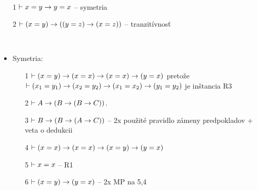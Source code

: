 \begin{lema}
~
    \begin{itemize}
        \item[1] $\vdash x=y \rightarrow y=x$ -- symetria
        \item[2] $\vdash (x=y) \rightarrow ((y=z) \rightarrow (x=z))$ --
            tranzitívnosť
    \end{itemize}
\end{lema}
\begin{dokaz}
~
\begin{itemize}
    \item Symetria:
        \begin{itemize}
        \item[1] $\vdash (x=y) \rightarrow (x=x) \rightarrow (x=x) \rightarrow (y=x)$
            pretože \\
                $\vdash (x_1=y_1) \rightarrow (x_2=y_2) \rightarrow
                    (x_1=x_2) \rightarrow (y_1=y_2)$ je inštancia R3
        \item[2] $\vdash A \rightarrow (B \rightarrow (B \rightarrow C))$.
        \item[3] $\vdash B \rightarrow (B \rightarrow (A \rightarrow C))$ --
            2x použité pravidlo zámeny predpokladov + veta o dedukcii
        \item[4] $\vdash (x=x) \rightarrow (x=x) \rightarrow (x=y)
                    \rightarrow (y=x)$
        \item[5] $\vdash x=x$ -- R1
        \item[6] $\vdash (x=y) \rightarrow (y=x)$ -- 2x MP na 5,4
        \end{itemize}


\end{itemize}
\end{dokaz}
